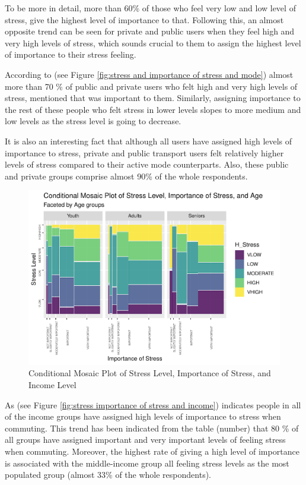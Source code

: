 \documentclass[
11pt, %
oneside, %
english, %
singlespacing, %
]{macthesis} %
\begin{document}
To be more in detail, more than 60\% of those who feel very low and low level of stress, give the highest level of importance to that. Following this, an almost opposite trend can be seen for private and public users when they feel high and very high levels of stress, which sounds crucial to them to assign the highest level of importance to their stress feeling.

According to (see Figure \ref{fig:stress and importance of stress and mode}) almost more than 70 \% of public and private users who felt high and very high levels of stress, mentioned that was important to them. Similarly, assigning importance to the rest of these people who felt stress in lower levels slopes to more medium and low levels as the stress level is going to decrease.

It is also an interesting fact that although all users have assigned high levels of importance to stress, private and public transport users felt relatively higher levels of stress compared to their active mode counterparts. Also, these public and private groups comprise almost 90\% of the whole respondents.
\begin{figure}
\includegraphics[width=0.85\linewidth]{thesis_files/figure-latex/unnamed-chunk-28-1} \caption{\label{fig:stress importance of stress and income}Conditional Mosaic Plot of Stress Level, Importance of Stress, and Income Level}\label{fig:unnamed-chunk-28}
\end{figure}
As (see Figure \ref{fig:stress importance of stress and income}) indicates people in all of the income groups have assigned high levels of importance to stress when commuting. This trend has been indicated from the table (number) that 80 \% of all groups have assigned important and very important levels of feeling stress when commuting. Moreover, the highest rate of giving a high level of importance is associated with the middle-income group all feeling stress levels as the most populated group (almost 33\% of the whole respondents).
\end{document}
